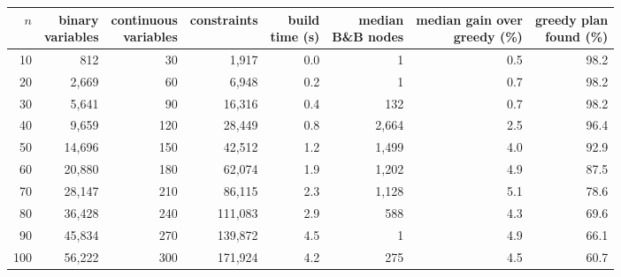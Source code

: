 \begin{tabular}{@{}rrrrrrrr@{}}
\toprule
$n$ & \shortstack[r]{binary\\variables} & \shortstack[r]{continuous\\variables} & constraints & \shortstack[r]{build\\time (s)} & \shortstack[r]{median\\B\&B nodes} & \shortstack[r]{median gain over\\greedy (\%)} & \shortstack[r]{greedy plan\\found (\%)} \\
\midrule
10 & 812 & 30 & 1,917 & 0.0 & 1 & 0.5 & 98.2 \\
20 & 2,669 & 60 & 6,948 & 0.2 & 1 & 0.7 & 98.2 \\
30 & 5,641 & 90 & 16,316 & 0.4 & 132 & 0.7 & 98.2 \\
40 & 9,659 & 120 & 28,449 & 0.8 & 2,664 & 2.5 & 96.4 \\
50 & 14,696 & 150 & 42,512 & 1.2 & 1,499 & 4.0 & 92.9 \\
60 & 20,880 & 180 & 62,074 & 1.9 & 1,202 & 4.9 & 87.5 \\
70 & 28,147 & 210 & 86,115 & 2.3 & 1,128 & 5.1 & 78.6 \\
80 & 36,428 & 240 & 111,083 & 2.9 & 588 & 4.3 & 69.6 \\
90 & 45,834 & 270 & 139,872 & 4.5 & 1 & 4.9 & 66.1 \\
100 & 56,222 & 300 & 171,924 & 4.2 & 275 & 4.5 & 60.7 \\
\bottomrule
\end{tabular}
